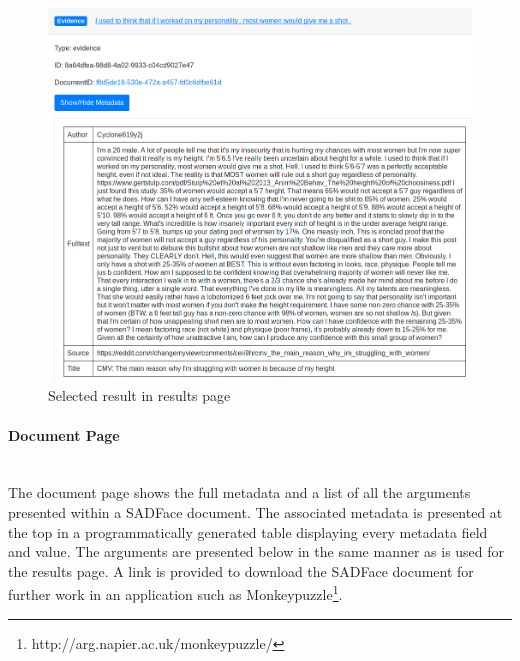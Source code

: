 \documentclass[12pt,a4paper]{article}
\begin{document}
\begin{figure}[H]
    \centering
    \includegraphics[scale=0.4]{Report/graphics/results-2.png}
    \caption{Selected result in results page}
    \label{fig:results2}
\end{figure}


\paragraph{Document Page}\mbox{}\\

The document page shows the full metadata and a list of all the arguments presented within a SADFace document. The associated metadata is presented at the top in a programmatically generated table displaying every metadata field and value. The arguments are presented below in the same manner as is used for the results page. A link is provided to download the SADFace document for further work in an application such as Monkeypuzzle\footnote{http://arg.napier.ac.uk/monkeypuzzle/}.
\end{document}
